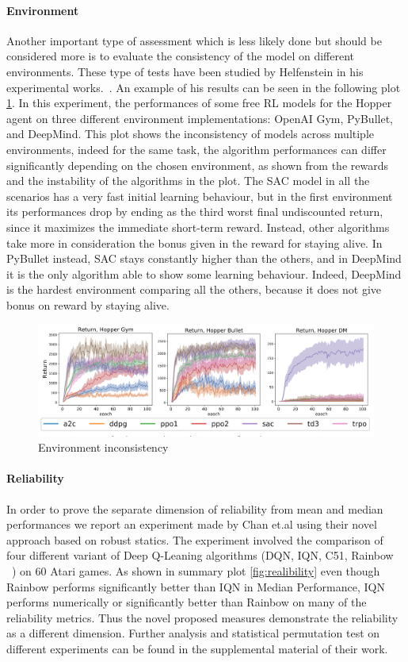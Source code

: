 \documentclass{article}
\begin{document}
\paragraph{Environment}
Another important type of assessment which is less likely done but should be considered more is to evaluate the consistency of the model on different environments. These type of tests have been studied by Helfenstein in his experimental works.~\cite{BenchmarkingDRL}. An example of his results can be seen in the following plot \ref{fig:env}. In this experiment, the performances of some free RL models for the Hopper agent on three different environment implementations: OpenAI Gym, PyBullet, and DeepMind. This plot shows the inconsistency of  models across multiple environments, indeed for the same task, the algorithm performances can differ significantly depending on the chosen environment, as shown from the rewards and the instability of the algorithms in the plot.
The SAC model in all the scenarios has a very fast initial learning behaviour, but in the first environment its performances drop by ending as the third worst final undiscounted return, since it maximizes the immediate short-term reward. Instead, other algorithms take more in consideration the bonus given in the reward for staying alive. In PyBullet instead, SAC stays constantly higher than the others, and in DeepMind it is the only algorithm able to show some learning behaviour. Indeed, DeepMind is the hardest environment comparing all the others, because it does not give bonus on reward by staying alive.

\begin{figure}[!htp]
	\centering
	\includegraphics[scale=0.3]{./images/Environements_plot.png}
	\caption{Environment inconsistency \cite{BenchmarkingDRL}}
	\label{fig:env}
	\footnotesize{}
\end{figure}
\paragraph{Reliability}
In order to prove the separate dimension of reliability from mean and median performances we report an experiment made by Chan et.al using their novel approach based on robust statics. The experiment involved the comparison of four different variant of Deep Q-Leaning algorithms (DQN, IQN, C51, Rainbow ~\cite{DQN, IQN, C51,Rainbow}) on 60 Atari games. As shown in summary plot \ref{fig:realibility} even though Rainbow performs significantly better than IQN in Median Performance, IQN performs numerically or significantly better than Rainbow on many of the reliability metrics. Thus the novel proposed measures demonstrate the reliability as a different dimension. Further analysis and  statistical permutation test on different experiments can be found in the supplemental material of their work.
\end{document}
